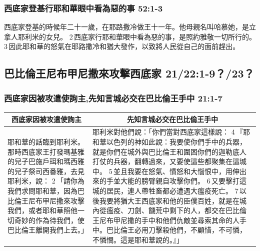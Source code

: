 \subsubsection{西底家登基行耶和華眼中看為惡的事 52:1-3}
西底家登基的時候年二十一歲，在耶路撒冷做王十一年。他母親名叫哈慕她，是立拿人耶利米的女兒。 2 西底家行耶和華眼中看為惡的事，是照約雅敬一切所行的。 3 因此耶和華的怒氣在耶路撒冷和猶大發作，以致將人民從自己的面前趕出。

\subsection{巴比倫王尼布甲尼撒來攻擊西底家 21/22:1-9？/23？}
\subsubsection{西底家因被攻遣使詢主,先知言城必交在巴比倫王手中 21:1-7}
\begin{table}[H]
\centering
\begin{tabular}{p{5.25cm}|p{11.250cm}}\hline\hline
\multicolumn{1}{c|}{西底家因被攻遣使詢主}&\multicolumn{1}{c}{先知言城必交在巴比倫王手中}\\\hline
耶和華的話臨到耶利米。那時西底家王打發瑪基雅的兒子巴施戶珥和瑪西雅的兒子祭司西番雅，去見耶利米，說： 2 「請你為我們求問耶和華，因為巴比倫王尼布甲尼撒來攻擊我們，或者耶和華照他一切奇妙的作為待我們，使巴比倫王離開我們上去。」
&耶利米對他們說：「你們當對西底家這樣說： 4 『耶和華以色列的神如此說：我要使你們手中的兵器，就是你們在城外與巴比倫王和圍困你們的迦勒底人打仗的兵器，翻轉過來，又要使這些都聚集在這城中。 5 並且我要在怒氣、憤怒和大惱恨中，用伸出來的手並大能的膀臂親自攻擊你們。 6 又要擊打這城的居民，連人帶牲畜都必遭遇大瘟疫死亡。 7 以後我要將猶大王西底家和他的臣僕百姓，就是在城內從瘟疫、刀劍、饑荒中剩下的人，都交在巴比倫王尼布甲尼撒的手中和他們仇敵並尋索其命的人手中。巴比倫王必用刀擊殺他們，不顧惜，不可憐，不憐憫。這是耶和華說的。』」\\\hline
\end{tabular}
\end{table}

